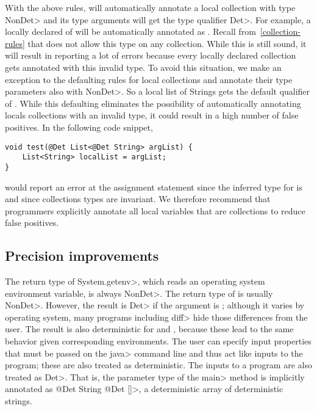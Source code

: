 With the above rules, \theDeterminismChecker will automatically annotate a local collection with type \<NonDet> and its
type arguments will get the type qualifier \<Det>. For example, a locally declared  of  will be automatically annotated
as . Recall from~\cref{collection-rules} that \theDeterminismChecker does not allow this type on
any collection. While this is still sound, it will result in \theDeterminismChecker reporting a lot of errors because every locally declared 
collection gets annotated with this invalid type. To avoid this situation, we make an exception to the defaulting rules for local collections
and annotate their type parameters also with \<NonDet>. So a local list of Strings gets the default qualifier of . While this defaulting eliminates the possibility of automatically annotating locals collections with an invalid
type, it could result in a high number of false positives. In the following code snippet,
\begin{verbatim}
void test(@Det List<@Det String> argList) {
    List<String> localList = argList;
}    
\end{verbatim}
\theDeterminismChecker would report an error at the assignment statement since the inferred type for  is 
 and since collections types are invariant.
We therefore recommend that programmers explicitly annotate
all local variables that are collections to reduce false positives.

\subsection{Precision improvements}\label{sec:precision-java}

The return type of \<System.getenv>, which reads an operating system
environment variable, is always \<NonDet>.
The return type of  is usually \<NonDet>. However,
the result is \<Det> if the argument is ; although
it varies by operating system, many programs including \<diff> hide those
differences from the user.
The result is also deterministic for  and
, because these lead to the same behavior given
corresponding environments.
The user can specify input properties that must be passed on the \<java>
command line and thus act like inputs to the program; these are also
treated as deterministic.
The inputs to a program are also treated as \<Det>.  That is, the parameter
type of the \<main> method is implicitly annotated as
\<@Det String @Det []>, a deterministic array of deterministic strings.

